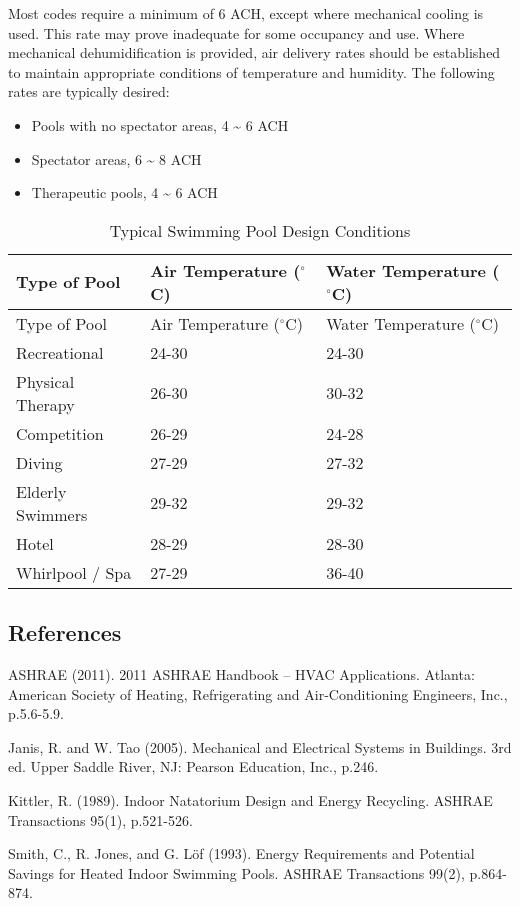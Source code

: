 Most codes require a minimum of 6 ACH, except where mechanical cooling is used. This rate may prove inadequate for some occupancy and use. Where mechanical dehumidification is provided, air delivery rates should be established to maintain appropriate conditions of temperature and humidity. The following rates are typically desired:

\begin{itemize}
\tightlist
\item
  Pools with no spectator areas, 4 \textasciitilde{} 6 ACH
\item
  Spectator areas, 6 \textasciitilde{} 8 ACH
\item
  Therapeutic pools, 4 \textasciitilde{} 6 ACH
\end{itemize}



\begin{longtable}[c]{@{}lll@{}}
\caption{Typical Swimming Pool Design Conditions \label{table:typical-swimming-pool-design-conditions}} \tabularnewline
\toprule 
Type of Pool & Air Temperature (\(^{\circ}\)C) & Water Temperature (\(^{\circ}\)C) \tabularnewline
\midrule
\endfirsthead

\toprule 
Type of Pool & Air Temperature (\(^{\circ}\)C) & Water Temperature (\(^{\circ}\)C) \tabularnewline
\midrule
\endhead

Recreational & 24-30 & 24-30 \tabularnewline
Physical Therapy & 26-30 & 30-32 \tabularnewline
Competition & 26-29 & 24-28 \tabularnewline
Diving & 27-29 & 27-32 \tabularnewline
Elderly Swimmers & 29-32 & 29-32 \tabularnewline
Hotel & 28-29 & 28-30 \tabularnewline
Whirlpool / Spa & 27-29 & 36-40 \tabularnewline
\bottomrule
\end{longtable}

\subsection{References}\label{references-030}

ASHRAE (2011). 2011 ASHRAE Handbook -- HVAC Applications. Atlanta: American Society of Heating, Refrigerating and Air-Conditioning Engineers, Inc., p.5.6-5.9.

Janis, R. and W. Tao (2005). Mechanical and Electrical Systems in Buildings. 3rd ed. Upper Saddle River, NJ: Pearson Education, Inc., p.246.

Kittler, R. (1989). Indoor Natatorium Design and Energy Recycling. ASHRAE Transactions 95(1), p.521-526.

Smith, C., R. Jones, and G. Löf (1993). Energy Requirements and Potential Savings for Heated Indoor Swimming Pools. ASHRAE Transactions 99(2), p.864-874.
